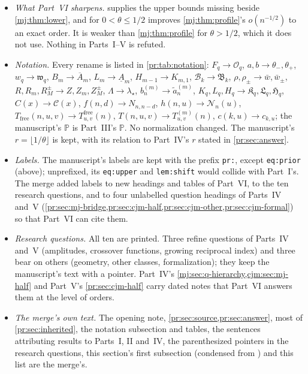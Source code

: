 \documentclass[11pt,a4paper]{article}
\theoremstyle{definition}\newaliascnt{definition}{theorem}
\theoremstyle{remark}\newaliascnt{remark}{theorem}
\newcommand{\Cat}{\mathcal C}
\newcommand{\ljP}{\mathbb P}
\begin{document}
\begin{itemize}
 is the merge's.
\item \emph{What Part~VI sharpens.}  supplies the
 upper bounds missing beside \cref{mj:thm:lower}, and for $0<\theta\le1/2$
 improves \cref{mj:thm:profile}'s $o(n^{-1/2})$ to an exact order. It is
 weaker than \cref{mj:thm:profile} for $\theta>1/2$, which it does not use.
 Nothing in Parts~I--V is refuted.
\item \emph{Notation.} Every rename is listed in \cref{pr:tab:notation}:
 $F_q\to\mathcal O_q$, $a,b\to\theta_-,\theta_+$, $w_q\to\mathfrak w_q$,
 $B_m\to\overline A_m$, $L_m\to\underline A_m$, $H_{m-1}\to K_{m,1}$,
 $\mathcal B_k\to\mathfrak B_k$, $\rho,\rho_\pm\to\bar w,\bar w_\pm$,
 $R,R_m,R^\pm_M\to Z,Z_m,Z^\pm_M$, $\Lambda\to\lambda_\star$,
 $b^{(m)}_n\to\tilde a^{(m)}_n$, $K_q,L_q,H_q\to\mathfrak K_q,\mathfrak
 L_q,\mathfrak H_q$, $C(x)\to\Cat(x)$, $f(n,d)\to N_{n,n-d}$,
 $h(n,u)\to\mathcal N_n(u)$, $T_{\mathrm{free}}(n,u,v)\to
 T^{\mathrm{free}}_{u,v}(n)$, $T(n,u,v)\to T^{(m)}_{u,v}(n)$,
 $c(k,u)\to c_{k,u}$; the manuscript's $\mathbb P$ is Part~III's $\ljP$.
 No normalization changed. The manuscript's $r=\lfloor1/\theta\rfloor$ is kept,
 with its relation to Part~IV's $r$ stated in \cref{pr:sec:answer}.
\item \emph{Labels.} The manuscript's labels are kept with the prefix
 \texttt{pr:}, except \texttt{eq:prior} (above); unprefixed, its
 \texttt{eq:upper} and \texttt{lem:shift} would collide with Part~I's. The
 merge added labels to new
 headings and tables of Part~VI, to the ten research questions, and to four
 unlabelled question headings of Parts~IV and~V
 (\cref{pr:sec:mj-bridge,pr:sec:cjm-half,pr:sec:cjm-other,pr:sec:cjm-formal})
 so that Part~VI can cite them.
\item \emph{Research questions.} All ten are printed. Three refine questions
 of Parts~IV and~V (amplitudes, crossover functions, growing reciprocal
 index) and three bear on others (geometry, other classes, formalization);
 they keep the manuscript's text with a pointer. Part~IV's
 \cref{mj:sec:q-hierarchy,cjm:sec:mj-half} and Part~V's
 \cref{pr:sec:cjm-half} carry dated notes that Part~VI answers them at the
 level of orders.
\item \emph{The merge's own text.} The opening note,
 \cref{pr:sec:source,pr:sec:answer}, most of \cref{pr:sec:inherited}, the
 notation subsection and tables, the sentences attributing results to
 Parts~I, II and~IV, the parenthesized pointers in the research questions,
 this section's first subsection (condensed from
 ) and this list are the merge's.

\end{itemize}
\end{document}
